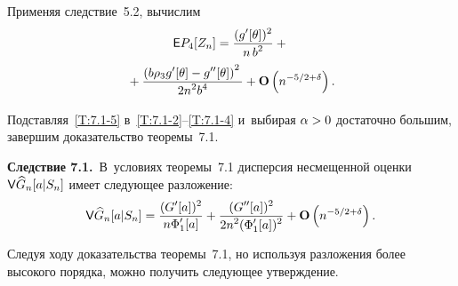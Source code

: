 \begin{multicols}{2}
 Применяя следствие~5.2, вычислим
 \begin{multline}
 {\sf E} P_{4}[Z_n]= \displaystyle\frac{\displaystyle (g'[\theta])^2\mathstrut}{\displaystyle n\,b^2\mathstrut}
 +{}\\
 {}+\displaystyle\frac{\displaystyle \left(b \rho_3 g'[\theta]-g''[\theta ]\right)^2\mathstrut}{\displaystyle 2n^2 b^4\mathstrut}
 + \mathbf{O}\left( n^{-5/2+\delta}\right).
  \label{T:7.1-5}
 \end{multline}

 Подставляя~\eqref{T:7.1-5} в~\eqref{T:7.1-2}--\eqref{T:7.1-4} 
 и~выбирая $\alpha\hm>0$ достаточно большим, завершим доказательство тео\-ре\-мы~7.1.

\vspace*{2pt}

\noindent
\textbf{Следствие 7.1.}\
 В~условиях теоремы~7.1
 дисперсия несмещенной оценки ${\sf V} \widehat{G}_n[a|S_n]$
 имеет следующее разложение:
 \begin{equation*}
{\sf V} \widehat{G}_n[a|S_n]=
 \displaystyle\frac{\displaystyle (G'[a])^2\mathstrut}{\displaystyle n\Phi_1'[a]\mathstrut}+
 \displaystyle\frac{\displaystyle (G''[a])^2\mathstrut}{\displaystyle 2n^2 (\Phi'_1[a])^2\mathstrut}+ \mathbf{O}\left(n^{-5/2+\delta}\right).
 \end{equation*}


 Следуя ходу доказательства теоремы~7.1, но используя разложения более высокого порядка, можно получить следующее утверждение.

 \vspace*{2pt}


\end{multicols}
